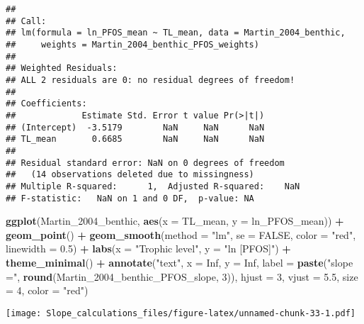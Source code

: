 \documentclass[
]{article}
\newenvironment{Shaded}{\begin{snugshade}}{\end{snugshade}}
\newcommand{\AttributeTok}[1]{\textcolor[rgb]{0.13,0.29,0.53}{#1}}
\newcommand{\ConstantTok}[1]{\textcolor[rgb]{0.56,0.35,0.01}{#1}}
\newcommand{\DecValTok}[1]{\textcolor[rgb]{0.00,0.00,0.81}{#1}}
\newcommand{\FloatTok}[1]{\textcolor[rgb]{0.00,0.00,0.81}{#1}}
\newcommand{\FunctionTok}[1]{\textcolor[rgb]{0.13,0.29,0.53}{\textbf{#1}}}
\newcommand{\NormalTok}[1]{#1}
\newcommand{\SpecialCharTok}[1]{\textcolor[rgb]{0.81,0.36,0.00}{\textbf{#1}}}
\newcommand{\StringTok}[1]{\textcolor[rgb]{0.31,0.60,0.02}{#1}}
\begin{document}
\begin{verbatim}
## 
## Call:
## lm(formula = ln_PFOS_mean ~ TL_mean, data = Martin_2004_benthic, 
##     weights = Martin_2004_benthic_PFOS_weights)
## 
## Weighted Residuals:
## ALL 2 residuals are 0: no residual degrees of freedom!
## 
## Coefficients:
##             Estimate Std. Error t value Pr(>|t|)
## (Intercept)  -3.5179        NaN     NaN      NaN
## TL_mean       0.6685        NaN     NaN      NaN
## 
## Residual standard error: NaN on 0 degrees of freedom
##   (14 observations deleted due to missingness)
## Multiple R-squared:      1,  Adjusted R-squared:    NaN 
## F-statistic:   NaN on 1 and 0 DF,  p-value: NA
\end{verbatim}

\begin{Shaded}
\begin{Highlighting}[]
\FunctionTok{ggplot}\NormalTok{(Martin\_2004\_benthic, }\FunctionTok{aes}\NormalTok{(}\AttributeTok{x =}\NormalTok{ TL\_mean, }\AttributeTok{y =}\NormalTok{ ln\_PFOS\_mean)) }\SpecialCharTok{+}
  \FunctionTok{geom\_point}\NormalTok{() }\SpecialCharTok{+}
  \FunctionTok{geom\_smooth}\NormalTok{(}\AttributeTok{method =} \StringTok{"lm"}\NormalTok{, }\AttributeTok{se =} \ConstantTok{FALSE}\NormalTok{, }\AttributeTok{color =} \StringTok{"red"}\NormalTok{, }\AttributeTok{linewidth =} \FloatTok{0.5}\NormalTok{) }\SpecialCharTok{+}
  \FunctionTok{labs}\NormalTok{(}\AttributeTok{x =} \StringTok{"Trophic level"}\NormalTok{,}
       \AttributeTok{y =} \StringTok{"ln [PFOS]"}\NormalTok{) }\SpecialCharTok{+}
  \FunctionTok{theme\_minimal}\NormalTok{() }\SpecialCharTok{+}
  \FunctionTok{annotate}\NormalTok{(}\StringTok{"text"}\NormalTok{, }\AttributeTok{x =} \ConstantTok{Inf}\NormalTok{, }\AttributeTok{y =} \ConstantTok{Inf}\NormalTok{, }\AttributeTok{label =} \FunctionTok{paste}\NormalTok{(}\StringTok{"slope ="}\NormalTok{, }\FunctionTok{round}\NormalTok{(Martin\_2004\_benthic\_PFOS\_slope, }\DecValTok{3}\NormalTok{)), }
           \AttributeTok{hjust =} \DecValTok{3}\NormalTok{, }\AttributeTok{vjust =} \FloatTok{5.5}\NormalTok{, }\AttributeTok{size =} \DecValTok{4}\NormalTok{, }\AttributeTok{color =} \StringTok{"red"}\NormalTok{)}
\end{Highlighting}
\end{Shaded}

\texttt{[image: Slope\_calculations\_files/figure-latex/unnamed-chunk-33-1.pdf]}
\end{document}
